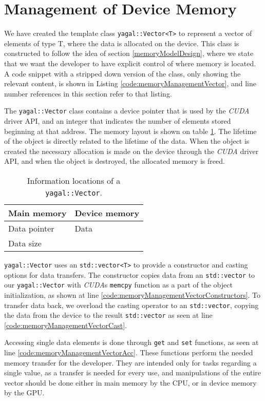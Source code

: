 \section{Management of Device Memory}
We have created the template class \texttt{yagal::Vector<T>} to represent a vector of elements of type T, where the data is allocated on the device. This class is constructed to follow the idea of section \ref{memoryModelDesign}, where we state that we want the developer to have explicit control of where memory is located. A code snippet with a stripped down version of the class, only showing the relevant content, is shown in Listing \ref{code:memoryManagementVector}, and line number references in this section refer to that listing.

The \texttt{yagal::Vector} class contains a device pointer that is used by the \textit{CUDA} driver API, and an integer that indicates the number of elements stored beginning at that address. The memory layout is shown on table \ref{tab:vecMem}. The lifetime of the object is directly related to the lifetime of the data. When the object is created the necessary allocation is made on the device through the \textit{CUDA} driver API, and when the object is destroyed, the allocated memory is freed.

\begin{table}[H]
\center
\begin{tabular}{|l|l|}
\hline
Main memory & Device memory \\
\hline
Data pointer & Data \\
Data size & \\
\hline
\end{tabular}
\caption{Information locations of a \texttt{yagal::Vector}.}
\label{tab:vecMem}
\end{table}

\texttt{yagal::Vector} uses an \texttt{std::vector<T>} to provide a constructor and casting options for data transfers. The constructor copies data from an \texttt{std::vector} to our \texttt{yagal::Vector} with \textit{CUDA}s \texttt{memcpy} function as a part of the object initialization, as shown at line \ref{code:memoryManagementVectorConstructors}. To transfer data back, we overload the casting operator to an \texttt{std::vector}, copying the data from the device to the result \texttt{std::vector} as seen at line \ref{code:memoryManagementVectorCast}.

Accessing single data elements is done through \texttt{get} and \texttt{set} functions, as seen at line \ref{code:memoryManagementVectorAcc}. These functions perform the needed memory transfer for the developer. They are intended only for tasks regarding a single value, as a transfer is needed for every use, and manipulations of the entire vector should be done either in main memory by the CPU, or in device memory by the GPU.

